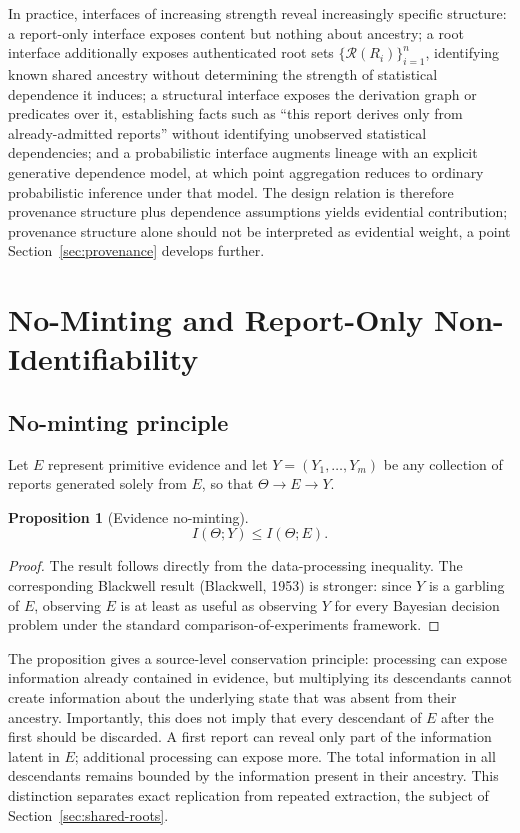 \documentclass[11pt]{article}
\newtheorem{proposition}{Proposition}
\theoremstyle{definition}
\begin{document}
In practice, interfaces of increasing strength reveal increasingly specific structure: a report-only interface exposes content but nothing about ancestry; a root interface additionally exposes authenticated root sets $\{\mathcal R(R_i)\}_{i=1}^n$, identifying known shared ancestry without determining the strength of statistical dependence it induces; a structural interface exposes the derivation graph or predicates over it, establishing facts such as ``this report derives only from already-admitted reports'' without identifying unobserved statistical dependencies; and a probabilistic interface augments lineage with an explicit generative dependence model, at which point aggregation reduces to ordinary probabilistic inference under that model. The design relation is therefore provenance structure plus dependence assumptions yields evidential contribution; provenance structure alone should not be interpreted as evidential weight, a point Section~\ref{sec:provenance} develops further.

\section{No-Minting and Report-Only Non-Identifiability}
\label{sec:no-minting-and-nonid}

\subsection{No-minting principle}
\label{sec:no-minting}

Let $E$ represent primitive evidence and let $Y=(Y_1,\ldots,Y_m)$ be any collection of reports generated solely from $E$, so that $\Theta\rightarrow E\rightarrow Y$.

\begin{proposition}[Evidence no-minting]
\[
I(\Theta;Y)\leq I(\Theta;E).
\]
\end{proposition}

\begin{proof}
The result follows directly from the data-processing inequality. The corresponding Blackwell result (Blackwell, 1953) is stronger: since $Y$ is a garbling of $E$, observing $E$ is at least as useful as observing $Y$ for every Bayesian decision problem under the standard comparison-of-experiments framework.
\end{proof}

The proposition gives a source-level conservation principle: processing can expose information already contained in evidence, but multiplying its descendants cannot create information about the underlying state that was absent from their ancestry. Importantly, this does not imply that every descendant of $E$ after the first should be discarded. A first report can reveal only part of the information latent in $E$; additional processing can expose more. The total information in all descendants remains bounded by the information present in their ancestry. This distinction separates exact replication from repeated extraction, the subject of Section~\ref{sec:shared-roots}.
\end{document}
